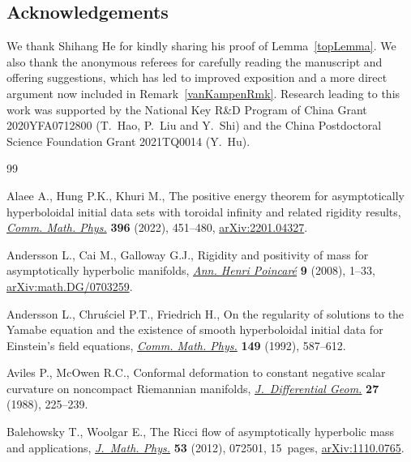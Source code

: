 \documentclass[10pt,a4paper]{amsart}
\numberwithin{equation}{section}
\begin{document}
\subsection*{Acknowledgements}

We thank Shihang He for kindly sharing his proof of Lemma~\ref{topLemma}. We also thank the anonymous referees for carefully reading the manuscript and offering suggestions, which has led to improved exposition and a more direct argument now included in Remark~\ref{vanKampenRmk}.
Research leading to this work was supported by the National Key R\&D Program of China Grant 2020YFA0712800 (T.~Hao, P.~Liu and Y.~Shi) and the China Postdoctoral Science Foundation Grant 2021TQ0014 (Y.~Hu).


\begin{thebibliography}{99}
\footnotesize\itemsep=-0.5pt

Alaee A., Hung P.K., Khuri M., The positive energy theorem for asymptotically
  hyperboloidal initial data sets with toroidal infinity and related rigidity
  results, \href{https://doi.org/10.1007/s00220-022-04467-x}{\textit{Comm. Math. Phys.}} \textbf{396} (2022), 451--480,
  \href{https://arxiv.org/abs/2201.04327}{arXiv:2201.04327}.

Andersson L., Cai M., Galloway G.J., Rigidity and positivity of mass for
  asymptotically hyperbolic manifolds, \href{https://doi.org/10.1007/s00023-007-0348-2}{\textit{Ann. Henri Poincar\'e}}
  \textbf{9} (2008), 1--33, \href{https://arxiv.org/abs/math.DG/0703259}{arXiv:math.DG/0703259}.

Andersson L., Chru\'sciel P.T., Friedrich H., On the regularity of solutions to
  the {Y}amabe equation and the existence of smooth hyperboloidal initial data
  for {E}instein's field equations, \href{https://doi.org/10.1007/BF02096944}{\textit{Comm. Math. Phys.}} \textbf{149}
  (1992), 587--612.

Aviles P., McOwen R.C., Conformal deformation to constant negative scalar
  curvature on noncompact {R}iemannian manifolds, \href{https://doi.org/10.4310/jdg/1214441781}{\textit{J.~Differential
  Geom.}} \textbf{27} (1988), 225--239.

Balehowsky T., Woolgar E., The {R}icci flow of asymptotically hyperbolic mass
  and applications, \href{https://doi.org/10.1063/1.4732118}{\textit{J.~Math. Phys.}} \textbf{53} (2012), 072501,
  15~pages, \href{https://arxiv.org/abs/1110.0765}{arXiv:1110.0765}.


\end{thebibliography}
\end{document}
